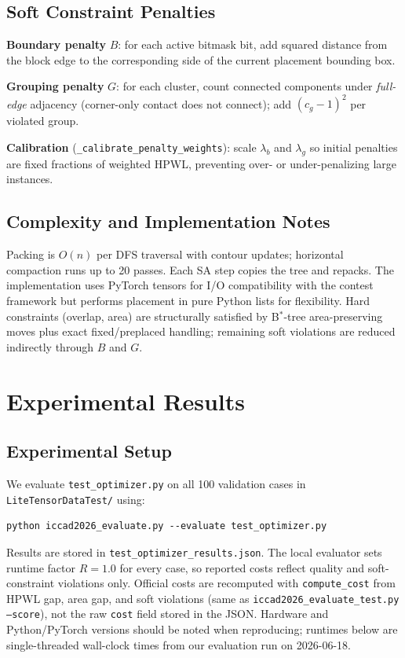 \documentclass[11pt]{article}
\begin{document}
\subsection{Soft Constraint Penalties}

\textbf{Boundary penalty} $B$: for each active bitmask bit, add squared distance from the block edge to the corresponding side of the current placement bounding box.

\textbf{Grouping penalty} $G$: for each cluster, count connected components under \emph{full-edge} adjacency (corner-only contact does not connect); add $(c_g - 1)^2$ per violated group.

\textbf{Calibration} (\texttt{\_calibrate\_penalty\_weights}): scale $\lambda_b$ and $\lambda_g$ so initial penalties are fixed fractions of weighted HPWL, preventing over- or under-penalizing large instances.

\subsection{Complexity and Implementation Notes}

Packing is $O(n)$ per DFS traversal with contour updates; horizontal compaction runs up to 20 passes. Each SA step copies the tree and repacks. The implementation uses PyTorch tensors for I/O compatibility with the contest framework but performs placement in pure Python lists for flexibility. Hard constraints (overlap, area) are structurally satisfied by B$^*$-tree area-preserving moves plus exact fixed/preplaced handling; remaining soft violations are reduced indirectly through $B$ and $G$.

\section{Experimental Results}

\subsection{Experimental Setup}

We evaluate \texttt{test\_optimizer.py} on all 100 validation cases in \texttt{LiteTensorDataTest/} using:
\begin{verbatim}
python iccad2026_evaluate.py --evaluate test_optimizer.py
\end{verbatim}
Results are stored in \texttt{test\_optimizer\_results.json}. The local evaluator sets runtime factor $R = 1.0$ for every case, so reported costs reflect quality and soft-constraint violations only. Official costs are recomputed with \texttt{compute\_cost} from HPWL gap, area gap, and soft violations (same as \texttt{iccad2026\_evaluate\_test.py --score}), not the raw \texttt{cost} field stored in the JSON. Hardware and Python/PyTorch versions should be noted when reproducing; runtimes below are single-threaded wall-clock times from our evaluation run on 2026-06-18.
\end{document}

